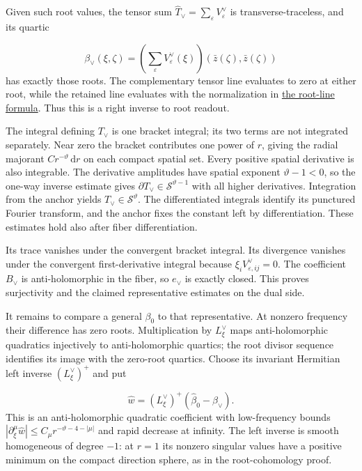 \documentclass[
  english,
  11pt,
  reqno]{amsart}
\begin{document}
Given such root values, the tensor sum
\(\widehat T_\vee=\sum_\varepsilon V^\vee_\varepsilon\) is
transverse-traceless, and its quartic

\label{eq:online-dual-canonical-frequency-quartic} \[
\beta_\vee(\xi,\zeta)
=\left(\sum_\varepsilon V^\vee_\varepsilon(\xi)\right)
  (\bar z(\zeta),\bar z(\zeta))
\] has exactly those roots. The complementary tensor line evaluates to
zero at either root, while the retained line evaluates with the
normalization in \hyperref[eq:online-dual-root-line-normalizations]{the
root-line formula}. Thus this is a right inverse to root readout.

The integral defining \(T_\vee\) is one bracket integral; its two terms
are not integrated separately. Near zero the bracket contributes one
power of \(r\), giving the radial majorant
\(Cr^{-\vartheta}\,\mathrm dr\) on each compact spatial set. Every
positive spatial derivative is also integrable. The derivative
amplitudes have spatial exponent \(\vartheta-1<0\), so the one-way
inverse estimate gives \(\partial T_\vee\in\mathscr S^{\vartheta-1}\)
with all higher derivatives. Integration from the anchor yields
\(T_\vee\in\mathscr S^\vartheta\). The differentiated integrals identify
its punctured Fourier transform, and the anchor fixes the constant left
by differentiation. These estimates hold also after fiber
differentiation.

Its trace vanishes under the convergent bracket integral. Its divergence
vanishes under the convergent first-derivative integral because
\(\xi_iV^\vee_{\varepsilon,ij}=0\). The coefficient \(B_\vee\) is
anti-holomorphic in the fiber, so \(e_\vee\) is exactly closed. This
proves surjectivity and the claimed representative estimates on the dual
side.

It remains to compare a general \(\beta_0\) to that representative. At
nonzero frequency their difference has zero roots. Multiplication by
\(L_\xi^\vee\) maps anti-holomorphic quadratics injectively to
anti-holomorphic quartics; the root divisor sequence identifies its
image with the zero-root quartics. Choose its invariant Hermitian left
inverse \((L_\xi^\vee)^+\) and put

\label{eq:online-dual-comparison-primitive-amplitude} \[
\widehat w=(L_\xi^\vee)^+
               (\widehat\beta_0-\beta_\vee).
\] This is an anti-holomorphic quadratic coefficient with low-frequency
bounds \(|\partial_\xi^\mu\widehat w|
\le C_\mu r^{-\vartheta-4-|\mu|}\) and rapid decrease at infinity. The
left inverse is smooth homogeneous of degree \(-1\): at \(r=1\) its
nonzero singular values have a positive minimum on the compact direction
sphere, as in the root-cohomology proof.
\end{document}

